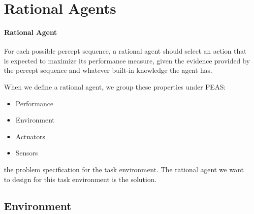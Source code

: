 \section{Rational Agents}

\paragraph{Rational Agent} For each possible percept sequence, a
rational agent should select an action that is expected to
maximize its performance measure, given the evidence provided by
the percept sequence and whatever built-in knowledge the agent
has.

When we define a rational agent, we group these properties
under PEAS:
\begin{itemize}
  \item Performance
  \item Environment
  \item Actuators
  \item Sensors
\end{itemize}
the problem specification for the task environment.
The rational agent we want to design for this task environment
is the solution.

\subsection{Environment}

